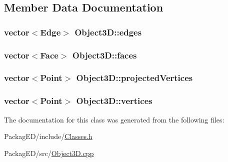 \subsection{Member Data Documentation}
\subsubsection[{\texorpdfstring{edges}{edges}}]{\setlength{\rightskip}{0pt plus 5cm}vector$<${\bf Edge}$>$ Object3\+D\+::edges}\hypertarget{class_object3_d_ad1d85cb131bbc39c772dc5badd0ec1c0}{}\label{class_object3_d_ad1d85cb131bbc39c772dc5badd0ec1c0}
\subsubsection[{\texorpdfstring{faces}{faces}}]{\setlength{\rightskip}{0pt plus 5cm}vector$<${\bf Face}$>$ Object3\+D\+::faces}\hypertarget{class_object3_d_a58677f390d3ba13026e68f4b2a530580}{}\label{class_object3_d_a58677f390d3ba13026e68f4b2a530580}
\subsubsection[{\texorpdfstring{projected\+Vertices}{projectedVertices}}]{\setlength{\rightskip}{0pt plus 5cm}vector$<${\bf Point}$>$ Object3\+D\+::projected\+Vertices\hspace{0.3cm}{\ttfamily [private]}}\hypertarget{class_object3_d_a40518019f2d67c105a32d218e38a0d4f}{}\label{class_object3_d_a40518019f2d67c105a32d218e38a0d4f}
\subsubsection[{\texorpdfstring{vertices}{vertices}}]{\setlength{\rightskip}{0pt plus 5cm}vector$<${\bf Point}$>$ Object3\+D\+::vertices}\hypertarget{class_object3_d_a225a5c970a1d3d343fc495764ccc3cfd}{}\label{class_object3_d_a225a5c970a1d3d343fc495764ccc3cfd}


The documentation for this class was generated from the following files\+:\begin{DoxyCompactItemize}
\item 
Packag\+E\+D/include/\hyperlink{_classes_8h}{Classes.\+h}\item 
Packag\+E\+D/src/\hyperlink{_object3_d_8cpp}{Object3\+D.\+cpp}\end{DoxyCompactItemize}

